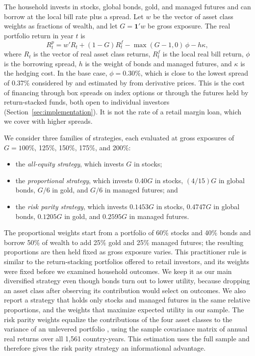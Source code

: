 \documentclass[12pt]{article}
\begin{document}
The household invests in stocks, global bonds, gold, and managed futures and can borrow at the local bill
rate plus a spread. Let $w$ be the vector of asset class weights as fractions of wealth, and let
$G=\mathbf{1}'w$ be gross exposure. The real portfolio return in year $t$ is
\begin{equation}
 R^p_t=w'R_t+(1-G)R^f_t-\max(G-1,0)\,\phi-h\kappa,
 \label{eq:return}
\end{equation}
where $R_t$ is the vector of real asset class returns, $R^f_t$ is the local real bill return, $\phi$ is
the borrowing spread, $h$ is the weight of bonds and managed futures, and $\kappa$ is the hedging cost. In the base
case, $\phi=0.30\%$, which is close to the lowest spread of 0.37\% considered by
\citet{AnarkulovaCederburgODoherty2025} and estimated by \citet{vanBinsbergenDiamondGrotteria2022} from
derivative prices. This is the cost of financing through box spreads on index options \citep{WangBoxFinancing2025} or
through the futures held by return-stacked funds, both open to individual investors
(Section~\ref{sec:implementation}). It is not the rate of a retail margin loan, which we cover with higher
spreads.

We consider three families of strategies, each evaluated at gross exposures of $G=100\%$, 125\%, 150\%,
175\%, and 200\%:
\begin{itemize}[leftmargin=2em,itemsep=2pt]
\item the \emph{all-equity strategy}, which invests $G$ in stocks;
\item the \emph{proportional strategy}, which invests $0.40G$ in stocks, $(4/15)G$ in global bonds, $G/6$
in gold, and $G/6$ in managed futures; and
\item the \emph{risk parity strategy}, which invests $0.1453G$ in stocks, $0.4747G$ in global bonds,
$0.1205G$ in gold, and $0.2595G$ in managed futures.
\end{itemize}
The proportional weights start from a portfolio of 60\% stocks and 40\% bonds and borrow 50\% of wealth
to add 25\% gold and 25\% managed futures; the resulting proportions are then held fixed as gross exposure
varies. This practitioner rule is similar to the return-stacking portfolios offered to retail investors,
and its weights were fixed before we examined household outcomes. We keep it as our main diversified
strategy even though bonds turn out to lower utility, because dropping an asset class after observing its
contribution would select on outcomes. We also report a strategy that holds only stocks and managed
futures in the same relative proportions, and the weights that maximize expected utility in our sample.
The risk parity weights equalize the contributions of the four asset classes to the variance of an
unlevered portfolio \citep{MaillardRoncalliTeiletche2010}, using the sample covariance matrix of annual
real returns over all 1,561 country-years. This estimation uses the full sample and therefore gives the
risk parity strategy an informational advantage.
\end{document}
